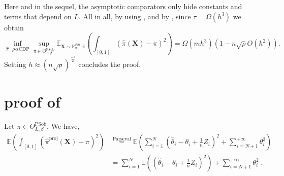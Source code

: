 \documentclass[10pt]{article} %
\newcommand{\Prob}[0]{\mathbb{P}}
\newcommand{\E}[0]{\mathbb{E}}
\newcommand\vect[1]{\mathbf{#1}}
\newcommand\p[1]{\left( {#1}\right)}
\newcommand\RG[1]{\textcolor{red}{#1}}
\newcommand\CL[1]{\textcolor{blue}{#1}}
\begin{document}
Here and in the sequel, the asymptotic comparators only hide constants and terms that depend on $L$.
All in all, by using , and by , since $\tau = \Omega(h^3)$ we obtain
\begin{equation}
    \inf_{\hat{\pi} \text{ $\rho$-zCDP}} \sup_{\pi \in  \Theta^{\text{PSob}}_{L, \beta}}
    \E_{\vect{X} \sim \Prob_{\pi}^{\otimes n}, \hat{\pi}}\p{ \int_{[0, 1]}\p{\hat{\pi}(\vect{X})- \pi}^2} = \Omega \p{m h^{3}} \p{1 - n \sqrt{\rho} O \p{h^{2}}}.
\end{equation}
Setting $h \approx \p{n \sqrt{\rho}}^{\frac{-1}{2}}$ concludes the proof.
    

\section{proof of }
\label{proofoflemma:projectionutility}


Let $\pi \in \Theta^{\text{PSob}}_{L, \beta}$.
    We have, 
    \begin{equation*}
    \begin{aligned}
         \E \p{ \int_{[0, 1]} \p{\hat{\pi}^{\text{proj}}(\vect{X}) - \pi}^2}
         & \stackrel{\text{Parseval}}{=}
          \E \p{ \sum_{i=1}^N \p{\hat{\theta}_i -\theta_i + \frac{1}{n} Z_i}^2 + \sum_{i=N+1}^{+\infty} \theta_i^2 } \\
          & \stackrel{\text{}}{=}
           \sum_{i=1}^N \E \p{\p{\hat{\theta}_i -\theta_i + \frac{1}{n} Z_i}^2} + \sum_{i=N+1}^{+\infty} \theta_i^2 \;.
    \end{aligned}
    \end{equation*}
\end{document}
